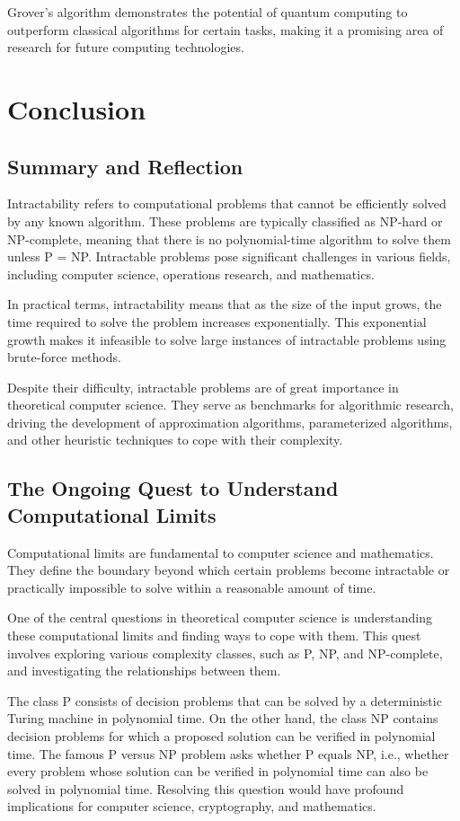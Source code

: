 \documentclass[12pt]{book} %
\begin{document}
Grover's algorithm demonstrates the potential of quantum computing to outperform classical algorithms for certain tasks, making it a promising area of research for future computing technologies.

\section{Conclusion}

\subsection{Summary and Reflection}

Intractability refers to computational problems that cannot be efficiently solved by any known algorithm. These problems are typically classified as NP-hard or NP-complete, meaning that there is no polynomial-time algorithm to solve them unless P = NP. Intractable problems pose significant challenges in various fields, including computer science, operations research, and mathematics.

In practical terms, intractability means that as the size of the input grows, the time required to solve the problem increases exponentially. This exponential growth makes it infeasible to solve large instances of intractable problems using brute-force methods.

Despite their difficulty, intractable problems are of great importance in theoretical computer science. They serve as benchmarks for algorithmic research, driving the development of approximation algorithms, parameterized algorithms, and other heuristic techniques to cope with their complexity.


\subsection{The Ongoing Quest to Understand Computational Limits}
Computational limits are fundamental to computer science and mathematics. They define the boundary beyond which certain problems become intractable or practically impossible to solve within a reasonable amount of time.

One of the central questions in theoretical computer science is understanding these computational limits and finding ways to cope with them. This quest involves exploring various complexity classes, such as P, NP, and NP-complete, and investigating the relationships between them.

The class P consists of decision problems that can be solved by a deterministic Turing machine in polynomial time. On the other hand, the class NP contains decision problems for which a proposed solution can be verified in polynomial time. The famous P versus NP problem asks whether P equals NP, i.e., whether every problem whose solution can be verified in polynomial time can also be solved in polynomial time. Resolving this question would have profound implications for computer science, cryptography, and mathematics.
\end{document}
